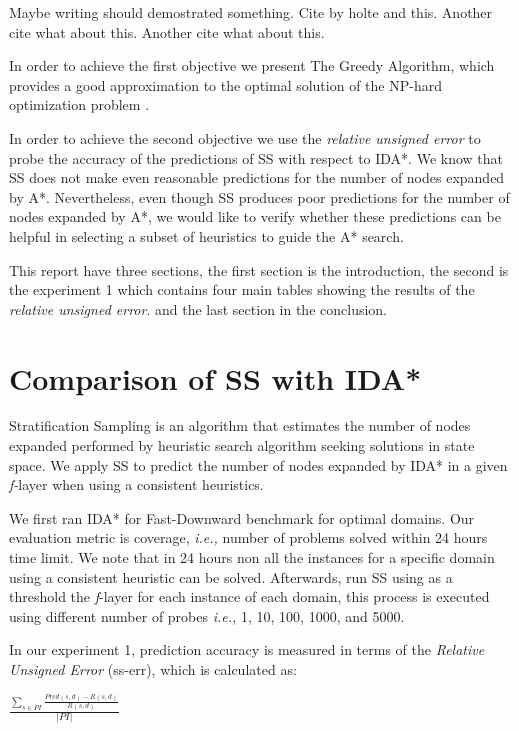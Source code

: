 \documentclass[a4paper,12pt]{article}
\begin{document}
Maybe writing \citep{krause2012submodular} should demostrated something.
Cite by holte \citep{holte2006maximizing} and this.
Another cite \citep{xu2014solving} what about this.
Another cite \citep{krause2007near} what about this.


In order to achieve the first objective we present The Greedy Algorithm, which provides a good approximation to the optimal solution of the NP-hard optimization problem \citep{krause2012submodular}. 

In order to achieve the second objective we use the \textit{relative unsigned error} to probe the accuracy of the predictions of SS with respect to IDA*. We know that SS does not make even reasonable predictions for the number of nodes expanded by A*. Nevertheless, even though SS produces poor predictions for the number of nodes expanded by A*, we would like to verify whether these predictions can be helpful in selecting a subset of heuristics to guide the A* search.

This report have three sections, the first section is the introduction, the second is the experiment 1 which contains four main tables showing the results of the \textit{relative unsigned error}. and the last section in the conclusion.

\section{Comparison of SS with IDA*}
Stratification Sampling is an algorithm that estimates the number of nodes expanded performed by heuristic search algorithm seeking solutions in state space. We apply SS to predict the number of nodes expanded by IDA* in a given \textit{f-}layer when using a consistent heuristics.

We first ran IDA* for Fast-Downward benchmark for optimal domains. Our evaluation metric is coverage, \textit{i.e.,} number of problems solved within 24 hours time limit. We note that in 24 hours non all the instances for a specific domain using a consistent heuristic can be solved. Afterwards, run SS using as a threshold the \textit{f}-layer for each instance of each domain, this process is executed using different number of probes \textit{i.e.,} 1, 10, 100, 1000, and 5000. 

In our experiment 1, prediction accuracy is measured in terms of the \textit{Relative Unsigned Error} (ss-err), which is calculated as:


\begin{center}
$
\frac{\sum_{s\in PI} \frac{Pred(s, d) - R(s, d)}{R(s, d)}}{|PI|}
$
\end{center}
\end{document}
